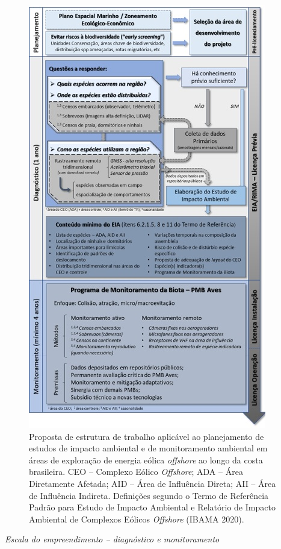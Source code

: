 \documentclass[
  oneside]{scrbook}
\begin{document}
\begin{figure}[H]

{\centering \includegraphics[width=0.65\linewidth]{imagens/cap08/Figura_8.6} 

}

\caption{Proposta de estrutura de trabalho aplicável ao planejamento de estudos de impacto ambiental e de monitoramento ambiental em áreas de exploração de energia eólica \emph{offshore} ao longo da costa brasileira. CEO -- Complexo Eólico \emph{Offshore}; ADA -- Área Diretamente Afetada; AID -- Área de Influência Direta; AII -- Área de Influência Indireta. Definições segundo o Termo de Referência Padrão para Estudo de Impacto Ambiental e Relatório de Impacto Ambiental de Complexos Eólicos \emph{Offshore} (IBAMA 2020).}\label{fig:66}
\end{figure}



\emph{Escala do empreendimento -- diagnóstico e monitoramento}
\end{document}
